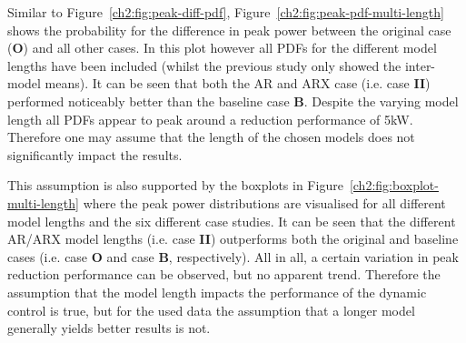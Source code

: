 

Similar to Figure~\ref{ch2:fig:peak-diff-pdf}, Figure~\ref{ch2:fig:peak-pdf-multi-length} shows the probability for the difference in peak power between the original case (\textbf{O}) and all other cases.
In this plot however all PDFs for the different model lengths have been included (whilst the previous study only showed the inter-model means).
It can be seen that both the AR and ARX case (i.e. case \textbf{II}) performed noticeably better than the baseline case \textbf{B}.
Despite the varying model length all PDFs appear to peak around a reduction performance of 5kW.
Therefore one may assume that the length of the chosen models does not significantly impact the results.



This assumption is also supported by the boxplots in Figure~\ref{ch2:fig:boxplot-multi-length} where the peak power distributions are visualised for all different model lengths and the six different case studies.
It can be seen that the different AR/ARX model lengths (i.e. case \textbf{II}) outperforms both the original and baseline cases (i.e. case \textbf{O} and case \textbf{B}, respectively).
All in all, a certain variation in peak reduction performance can be observed, but no apparent trend.
Therefore the assumption that the model length impacts the performance of the dynamic control is true, but for the used data the assumption that a longer model generally yields better results is not.
